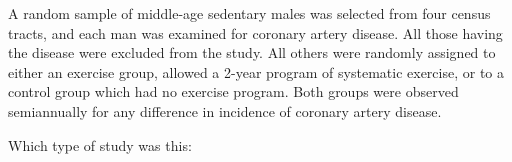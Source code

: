 
A random sample of middle-age sedentary males was selected from four
census tracts, and each man was examined for coronary artery disease.
All those having the disease were excluded from the study.  All others
were randomly assigned to either an exercise group, allowed a 2-year
program of systematic exercise, or to a control group which had no
exercise program.  Both groups were observed semiannually for any
difference in incidence of coronary artery disease.

Which type of study was this:
\begin{MultipleChoice}
\end{MultipleChoice}


